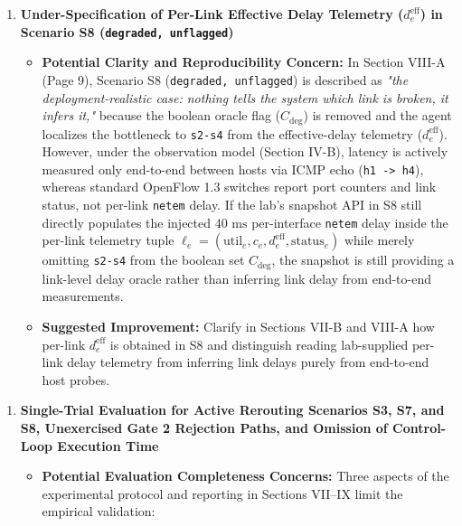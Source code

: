 \documentclass[11pt,a4paper]{article}
\begin{document}
\begin{enumerate}[leftmargin=1.6em,itemsep=3pt]
\item \textbf{Under-Specification of Per-Link Effective Delay Telemetry ($d_e^{\text{eff}}$) in Scenario S8 (\texttt{degraded, unflagged})}
\begin{itemize}[leftmargin=1.8em,itemsep=2pt]
\item \textbf{Potential Clarity and Reproducibility Concern:} In Section VIII-A (Page 9), Scenario S8 (\texttt{degraded, unflagged}) is described as \emph{"the deployment-realistic case: nothing tells the system which link is broken, it infers it,"} because the boolean oracle flag ($C_{\text{deg}}$) is removed and the agent localizes the bottleneck to \texttt{s2-s4} from the effective-delay telemetry ($d_e^{\text{eff}}$). However, under the observation model (Section IV-B), latency is actively measured only end-to-end between hosts via ICMP echo (\texttt{h1 -> h4}), whereas standard OpenFlow 1.3 switches report port counters and link status, not per-link \texttt{netem} delay. If the lab's snapshot API in S8 still directly populates the injected $40\text{ ms}$ per-interface \texttt{netem} delay inside the per-link telemetry tuple $\ell_e = (\text{util}_e, c_e, d_e^{\text{eff}}, \text{status}_e)$ while merely omitting \texttt{s2-s4} from the boolean set $C_{\text{deg}}$, the snapshot is still providing a link-level delay oracle rather than inferring link delay from end-to-end measurements.
\item \textbf{Suggested Improvement:} Clarify in Sections VII-B and VIII-A how per-link $d_e^{\text{eff}}$ is obtained in S8 and distinguish reading lab-supplied per-link delay telemetry from inferring link delays purely from end-to-end host probes.
\end{itemize}
\end{enumerate}
\begin{enumerate}[leftmargin=1.6em,itemsep=3pt]
\item \textbf{Single-Trial Evaluation for Active Rerouting Scenarios S3, S7, and S8, Unexercised Gate 2 Rejection Paths, and Omission of Control-Loop Execution Time}
\begin{itemize}[leftmargin=1.8em,itemsep=2pt]
\item \textbf{Potential Evaluation Completeness Concerns:} Three aspects of the experimental protocol and reporting in Sections VII–IX limit the empirical validation:
\end{itemize}
\end{enumerate}
\end{document}
